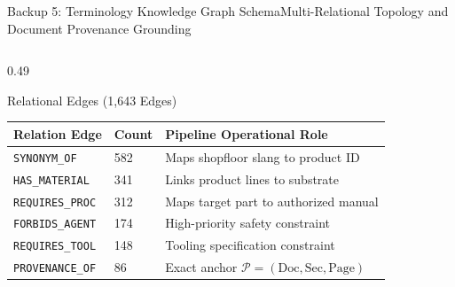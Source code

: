 \documentclass[aspectratio=169,10pt]{beamer}
\begin{document}
\begin{frame}{Backup 5: Terminology Knowledge Graph Schema}{Multi-Relational Topology and Document Provenance Grounding}
\begin{columns}[T]
    \begin{column}{0.49\textwidth}
      \begin{exampleblock}{Relational Edges (1,643 Edges)}
        \centering\scriptsize
        \renewcommand{\arraystretch}{0.80}
        \setlength{\tabcolsep}{2.5pt}
        \begin{tabular}{@{}llp{4.2cm}@{}}
          \toprule
          \textbf{Relation Edge} & \textbf{Count} & \textbf{Pipeline Operational Role} \\
          \midrule
          \texttt{SYNONYM\_OF} & 582 & Maps shopfloor slang to product ID \\
          \texttt{HAS\_MATERIAL} & 341 & Links product lines to substrate \\
          \texttt{REQUIRES\_PROC} & 312 & Maps target part to authorized manual \\
          \texttt{FORBIDS\_AGENT} & 174 & High-priority safety constraint \\
          \texttt{REQUIRES\_TOOL} & 148 & Tooling specification constraint \\
          \texttt{PROVENANCE\_OF} & 86 & Exact anchor $\mathcal{P} = (\text{Doc}, \text{Sec}, \text{Page})$ \\
          \bottomrule
        \end{tabular}
      \end{exampleblock}
    \end{column}
  \end{columns}
\end{frame}
\end{document}
